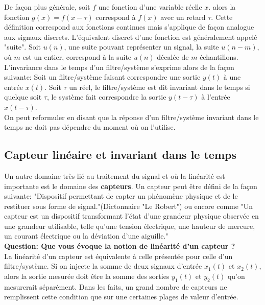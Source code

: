 \documentclass[11pt,a4paper]{article}
\begin{document}
De façon plus générale, soit $f$ une fonction d'une variable réelle $x$. alors la fonction $g(x) = f(x-\tau)$ correspond à $f(x)$ avec un retard $\tau$. Cette définition correspond aux fonctions continues mais s'applique de façon analogue aux signaux discrets. L'équivalent discret d'une fonction est généralement appelé "suite". Soit $u(n)$, une suite pouvant représenter un signal, la suite $u(n-m)$, où $m$ est un entier, correspond à la suite $u(n)$ décalée de $m$ échantillons. \\

L'invariance dans le temps d'un filtre/système s'exprime alors de la façon suivante: Soit un filtre/système faisant correspondre une sortie $y(t)$ à une entrée $x(t)$. Soit $\tau$ un réel, le filtre/système est dit invariant dans le temps si quelque soit $\tau$, le système fait correspondre la sortie $y(t-\tau)$ à l'entrée $x(t-\tau)$.\\

On peut reformuler en disant que la réponse d'un filtre/système invariant dans le temps ne doit pas dépendre du moment où on l'utilise.\\

\subsection{Capteur linéaire et invariant dans le temps}
Un autre domaine très lié au traitement du signal et où la linéarité est importante est le domaine des \textbf{capteurs}. Un capteur peut être défini de la façon suivante: "Dispositif permettant de capter un phénomène physique et de le restituer sous forme de signal."(Dictonnaire "Le Robert") ou encore comme "Un capteur est un dispositif transformant l'état d'une grandeur physique observée en une grandeur utilisable, telle qu'une tension électrique, une hauteur de mercure, un courant électrique ou la déviation d'une aiguille."\\

\textbf{Question: Que vous évoque la notion de linéarité d'un capteur ?}\\

La linéarité d'un capteur est équivalente à celle présentée pour celle d'un filtre/système. Si on injecte la somme de deux signaux d'entrée $x_1(t)$ et $x_2(t)$, alors la sortie mesurée doit être la somme des sorties $y_1(t)$ et $y_2(t)$ qu'on mesurerait séparément. Dans les faits, un grand nombre de capteurs ne remplissent cette condition que sur une certaines plages de valeur d'entrée.\\
\end{document}
